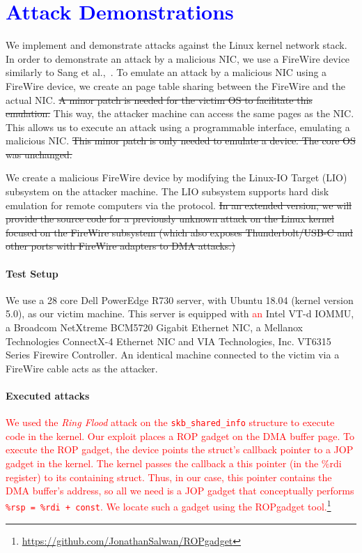 \section{\textcolor{blue}{Attack Demonstrations}}\label{Sec:setup}


We implement and demonstrate \compound attacks against the Linux kernel network stack. 
In order to demonstrate an attack by a malicious NIC, we use a FireWire device similarly to Sang et al.,~\cite{SLND10}. To emulate an attack by a malicious NIC using a FireWire device, we create an \iova{} page table sharing between the FireWire and the actual NIC. \sout{A minor patch is needed for the victim OS to facilitate this emulation.} This way, the attacker machine can access the same pages as the NIC. This allows us to execute an attack using a programmable interface, emulating a malicious NIC. \sout{This minor patch is only needed to emulate a device. The core OS was unchanged.}


We create a malicious FireWire device by modifying the Linux-IO Target (LIO) subsystem on the attacker machine. The LIO subsystem supports hard disk emulation for remote computers via the \spb{} protocol. \sout{In an extended version, we will provide the source code for a previously unknown \simple attack on the Linux kernel focused on the FireWire subsystem (which also exposes Thunderbolt/USB-C and other ports with FireWire adapters to DMA attacks.)}


\paragraph{Test Setup}
We use a 28 core Dell PowerEdge R730 server, with Ubuntu 18.04 (kernel version 5.0), as our victim machine. This server is equipped with \textcolor{red}{an} Intel VT-d IOMMU, a Broadcom NetXtreme BCM5720 Gigabit Ethernet NIC, a Mellanox Technologies ConnectX-4 Ethernet NIC and VIA Technologies, Inc. VT6315 Series Firewire Controller. An identical machine connected to the victim via a FireWire cable acts as the attacker. 

\paragraph{Executed attacks}
\textcolor{red}{We used the \textit{Ring Flood} attack on the \texttt{skb\_shared\_info} structure to execute code in the kernel.
Our exploit places a ROP gadget on the DMA buffer page. To execute the ROP gadget, the device points the struct's callback pointer to a JOP gadget in the kernel. The kernel passes the callback a this pointer (in the \%rdi register) to its containing struct. Thus, in our case, this pointer contains the DMA buffer's address, so all we need is a JOP gadget that conceptually performs \texttt{\%rsp = \%rdi + const}. We locate such a gadget using the ROPgadget tool.\footnote{\url{https://github.com/JonathanSalwan/ROPgadget}}}